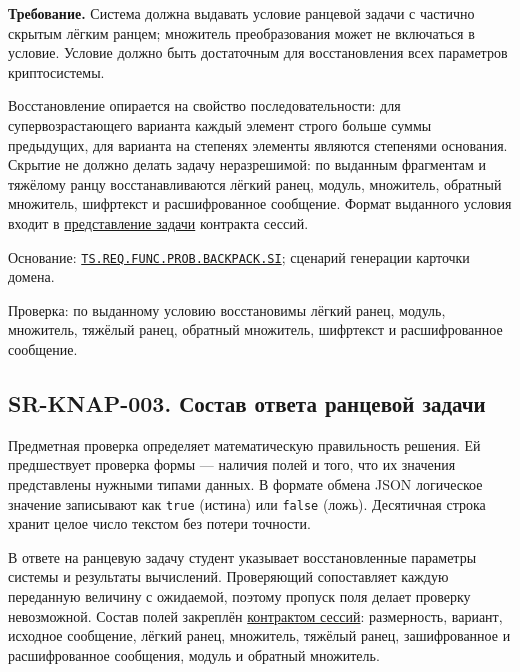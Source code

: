 \documentclass[12pt,a4paper]{article}
\begin{document}
\textbf{Требование.} Система должна выдавать условие ранцевой задачи с частично скрытым лёгким ранцем; множитель преобразования может не включаться в условие. Условие должно быть достаточным для восстановления всех параметров криптосистемы.

Восстановление опирается на свойство последовательности: для супервозрастающего варианта каждый элемент строго больше суммы предыдущих, для варианта на степенях элементы являются степенями основания. Скрытие не должно делать задачу неразрешимой: по выданным фрагментам и тяжёлому ранцу восстанавливаются лёгкий ранец, модуль, множитель, обратный множитель, шифртекст и расшифрованное сообщение. Формат выданного условия входит в {\href{../07\_Программные\_требования/DOC-06.2\_Сессии\_задач\_и\_планировщик.pdf\#представление-сессии-и-задачи}{представление задачи}} контракта сессий.

Основание: {\href{../02\_Техническое\_задание/DOC-02\_Техническое\_задание.pdf\#ts-req-func-prob-backpack-si}{\texttt{TS.\allowbreak{}REQ.\allowbreak{}FUNC.\allowbreak{}PROB.\allowbreak{}BACKPACK.\allowbreak{}SI}}}; сценарий генерации карточки домена.

Проверка: по выданному условию восстановимы лёгкий ранец, модуль, множитель, тяжёлый ранец, обратный множитель, шифртекст и расшифрованное сообщение.

\subsection{SR-KNAP-003. Состав ответа ранцевой задачи}\label{sr-knap-003-ux441ux43eux441ux442ux430ux432-ux43eux442ux432ux435ux442ux430-ux440ux430ux43dux446ux435ux432ux43eux439-ux437ux430ux434ux430ux447ux438}

\hypertarget{sr-knap-003-состав-ответа-ранцевой-задачи}{}

\hypertarget{sr-knap-003}{}

Предметная проверка определяет математическую правильность решения. Ей предшествует проверка формы --- наличия полей и того, что их значения представлены нужными типами данных. В формате обмена JSON логическое значение записывают как \texttt{true} (истина) или \texttt{false} (ложь). Десятичная строка хранит целое число текстом без потери точности.

В ответе на ранцевую задачу студент указывает восстановленные параметры системы и результаты вычислений. Проверяющий сопоставляет каждую переданную величину с ожидаемой, поэтому пропуск поля делает проверку невозможной. Состав полей закреплён {\href{../07\_Программные\_требования/DOC-06.2\_Сессии\_задач\_и\_планировщик.pdf\#ранцевая-задача}{контрактом сессий}}: размерность, вариант, исходное сообщение, лёгкий ранец, множитель, тяжёлый ранец, зашифрованное и расшифрованное сообщения, модуль и обратный множитель.
\end{document}
